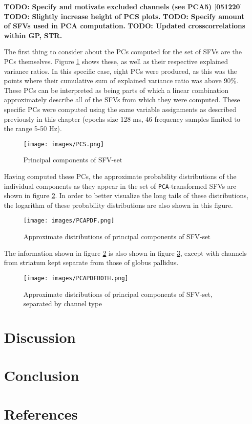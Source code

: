\documentclass{article}
\begin{document}
\textbf{TODO: Specify and motivate excluded channels (see PCA5) [051220]}
\textbf{TODO: Slightly increase height of PCS plots.}
\textbf{TODO: Specify amount of SFVs used in PCA computation.}
\textbf{TODO: Updated crosscorrelations within GP, STR.}

The first thing to consider about the PCs computed for the set of SFVs are the PCs themselves.
Figure \ref{fig:PCS} shows these, as well as their respective explained variance ratios. 
In this specific case, eight PCs were produced, as this was the points where their cumulative sum of explained variance ratio was above 90\%.
These PCs can be interpreted as being parts of which a linear combination approximately describe all of the SFVs from which they were computed.
These specific PCs were computed using the same variable assignments as described previously in this chapter (epochs size 128 ms, 46 frequency samples limited to the range 5-50 Hz).

\begin{figure}
    \centering
    \centerline{\texttt{[image: images/PCS.png]}}
    \caption{Principal components of SFV-set}
    \label{fig:PCS}
\end{figure}

Having computed these PCs, the approximate probability distributions of the individual components as they appear in the set of \texttt{PCA}-transformed SFVs are shown in figure \ref{fig:PCAPDF}. 
In order to better visualize the long tails of these distributions, the logarithm of these probability distributions are also shown in this figure.

\begin{figure}
    \centering
    \centerline{\texttt{[image: images/PCAPDF.png]}}
    \caption{Approximate distributions of principal components of SFV-set}
    \label{fig:PCAPDF}
\end{figure}

The information shown in figure \ref{fig:PCAPDF} is also shown in figure \ref{fig:PCAPDFBOTH}, except with channels from striatum kept separate from those of globus pallidus.

\begin{figure}
    \centering
    \centerline{\texttt{[image: images/PCAPDFBOTH.png]}}
    \caption{Approximate distributions of principal components of SFV-set, separated by channel type}
    \label{fig:PCAPDFBOTH}
\end{figure}

\newpage
\section{Discussion}

\newpage
\section{Conclusion}

\newpage
\section{References}

\end{document}
